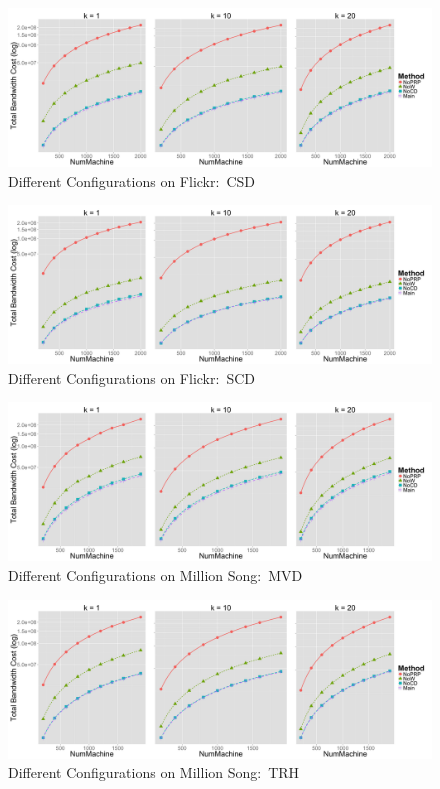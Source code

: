 \begin{figure}[htpb!]
  \centering
  \includegraphics[width=1.0\linewidth]{exp/in/f2.png}
  \caption{Different Configurations on Flickr:~CSD}
  \label{fig:in_f2}
\end{figure}

\begin{figure}[htpb!]
  \centering
  \includegraphics[width=1.0\linewidth]{exp/in/f3.png}
  \caption{Different Configurations on Flickr:~SCD}
  \label{fig:in_f3}
\end{figure}

\begin{figure}[htpb!]
  \centering
  \includegraphics[width=1.0\linewidth]{exp/in/mvd.png}
  \caption{Different Configurations on Million Song:~MVD}
  \label{fig:in_mvd}
\end{figure}

\begin{figure}[htpb!]
  \centering
  \includegraphics[width=1.0\linewidth]{exp/in/trh.png}
  \caption{Different Configurations on Million Song:~TRH}
  \label{fig:in_trh}
\end{figure}

